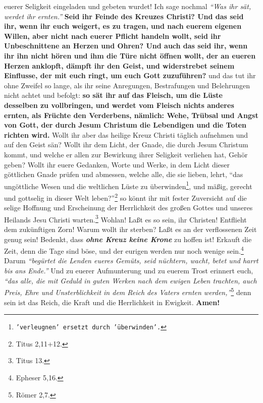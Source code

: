 euerer Seligkeit eingeladen und gebeten wurdet! Ich sage nochmal
\textit{"`Was ihr sät, werdet ihr ernten."'}
\label{ref:18_11_feinde_des_kreuzes}
\textbf{Seid ihr Feinde des Kreuzes Christi? Und das seid
ihr, wenn ihr euch weigert, es zu tragen, und nach euerem eigenen Willen, aber
nicht nach euerer Pflicht handeln wollt, seid ihr
Unbeschnittene an Herzen und
Ohren? Und auch das seid ihr, wenn ihr ihn nicht hören und ihm die Türe nicht
öffnen wollt, der an eueren Herzen anklopft, dämpft ihr den Geist, und
widerstrebet seinem Einflusse, der mit euch ringt, um euch Gott zuzuführen?}
und das tut ihr ohne Zweifel so lange, als ihr seine Anregungen, Bestrafungen
und Belehrungen nicht achtet und befolgt: \textbf{so sät ihr auf das Fleisch,
um die
Lüste desselben zu vollbringen, und werdet vom Fleisch nichts anderes ernten,
als Früchte den Verderbens, nämlich: Wehe, Trübsal und Angst von Gott, der durch
Jesum Christum die Lebendigen und die Toten richten wird.} Wollt ihr aber
das heilige Kreuz Christi täglich aufnehmen und auf den Geist sän? Wollt ihr
dem Licht, der Gnade, die durch Jesum Christum kommt, und welche er allen
zur Bewirkung ihrer Seligkeit verliehen hat, Gehör geben? Wollt ihr euere
Gedanken, Worte und Werke, in dem Licht dieser göttlichen
Gnade prüfen und
abmessen, welche alle, die sie lieben, lehrt,
"`das ungöttliche Wesen und die
weltlichen Lüste zu überwinden\footnote{\texttt{'verleugnen' ersetzt durch
'überwinden'.}}, und mäßig, gerecht
und gottselig in dieser Welt
leben?"'\footnote{Titus 2,11+12.}
so könnt ihr mit fester Zuversicht auf
die selige Hoffnung und Erscheinung der Herrlichkeit des großen Gottes und
unseres Heilands Jesu Christi warten.\footnote{Titus 13.}
Wohlan! Laßt es so
sein, ihr Christen! Entflieht dem zukünftigen Zorn! Warum wollt ihr sterben?
Laßt es an der verflossenen Zeit genug sein! Bedenkt, dass \textbf{\textit{ohne
Kreuz keine
Krone}} zu hoffen ist! Erkauft die Zeit, denn die
Tage sind böse, und der
eurigen werden nur noch wenige sein.\footnote{Epheser 5,16.}
Darum
\textit{"`begürtet die
Lenden eueres Gemüts, seid nüchtern, wacht, betet und harrt bis ans
Ende."'}
Und zu euerer Aufmunterung und zu euerem Trost erinnert euch,
\textit{"`das alle, die mit
Geduld in guten Werken nach dem ewigen Leben trachten, auch Preis, Ehre und
Unsterblichkeit in dem Reich des Vaters ernten werden,"'}\footnote{Römer 2,7.}
denn sein ist das Reich, die Kraft und die Herrlichkeit in Ewigkeit.
\textbf{Amen!}



